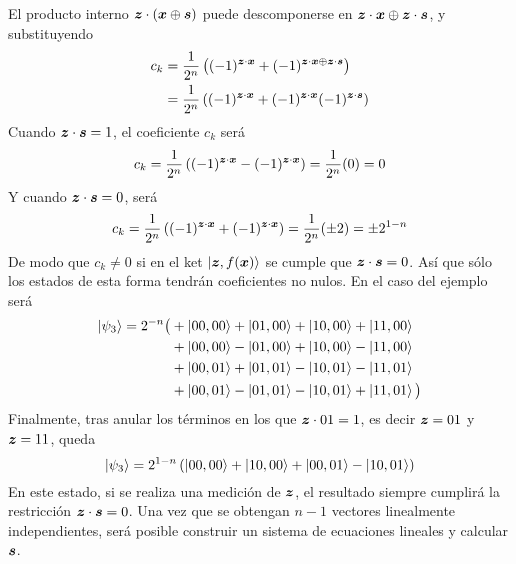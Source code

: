 %
El producto interno $\boldsymbol{z} \cdot (\boldsymbol{x} \oplus \boldsymbol{s})$ puede descomponerse en $ \boldsymbol{z} \cdot \boldsymbol{x}
\oplus \boldsymbol{z} \cdot \boldsymbol{s}$, y substituyendo
%
\begin{equation}
\begin{split}
c_k & = \frac{1}{2^n} \left((-1)^{\boldsymbol{z} \cdot \boldsymbol{x}} + (-1)^{\boldsymbol{z} \cdot \boldsymbol{x} \oplus 
\boldsymbol{z} \cdot \boldsymbol{s}} \right) \\
	& = \frac{1}{2^n} \left((-1)^{\boldsymbol{z} \cdot \boldsymbol{x}} + (-1)^{\boldsymbol{z} \cdot \boldsymbol{x}}
	(-1)^{\boldsymbol{z} \cdot \boldsymbol{s}} \right)
\end{split}
\end{equation}
%
Cuando $ \boldsymbol{z} \cdot \boldsymbol{s} = 1$, el coeficiente $c_k$ será
%
\begin{equation}
\begin{split}
c_k = \frac{1}{2^n} \left((-1)^{\boldsymbol{z} \cdot \boldsymbol{x}} - (-1)^{\boldsymbol{z} \cdot \boldsymbol{x}} \right) =
	\frac{1}{2^n} (0) = 0
\end{split}
\end{equation}
%
Y cuando $ \boldsymbol{z} \cdot \boldsymbol{s} = 0$, será
%
\begin{equation}
c_k = \frac{1}{2^n} \left((-1)^{\boldsymbol{z} \cdot \boldsymbol{x}} + (-1)^{\boldsymbol{z} \cdot \boldsymbol{x}} \right)
	= \frac{1}{2^n} (\pm 2) = \pm 2^{1-n}
\end{equation}
%
De modo que $c_k \neq 0$ si en el ket $\ket{\boldsymbol{z}, f(\boldsymbol{x})}$ se cumple que 
$\boldsymbol{z} \cdot \boldsymbol{s} = 0$. Así que sólo los estados de esta forma tendrán coeficientes 
no nulos. En el caso del ejemplo será
%
\begin{equation}
\begin{split}
\ket{\psi_3} = 2^{-n} \big( &
		+ \ket{00,00} + \ket{01,00} + \ket{10,00} + \ket{11,00} \\
	& + \ket{00,00} - \ket{01,00} + \ket{10,00} - \ket{11,00} \\
	& + \ket{00,01} + \ket{01,01} - \ket{10,01} - \ket{11,01} \\
	& + \ket{00,01} - \ket{01,01} - \ket{10,01} + \ket{11,01}
	\big)
\end{split}
\end{equation}
%
Finalmente, tras anular los términos en los que $\boldsymbol{z} \cdot 01 = 1$, es decir 
$\boldsymbol{z}=01$ y $\boldsymbol{z}=11$, queda
%
\begin{equation}
	\ket{\psi_3} = 2^{1-n} \left( \ket{00,00} + \ket{10,00} + \ket{00,01} - 
\ket{10,01} \right)
\end{equation}
%
En este estado, si se realiza una medición de $\boldsymbol{z}$, el resultado siempre cumplirá 
la restricción $\boldsymbol{z} \cdot \boldsymbol{s} = 0$. Una vez que se obtengan $n-1$ vectores 
linealmente independientes, será posible construir un sistema de ecuaciones lineales y 
calcular $\boldsymbol{s}$.

